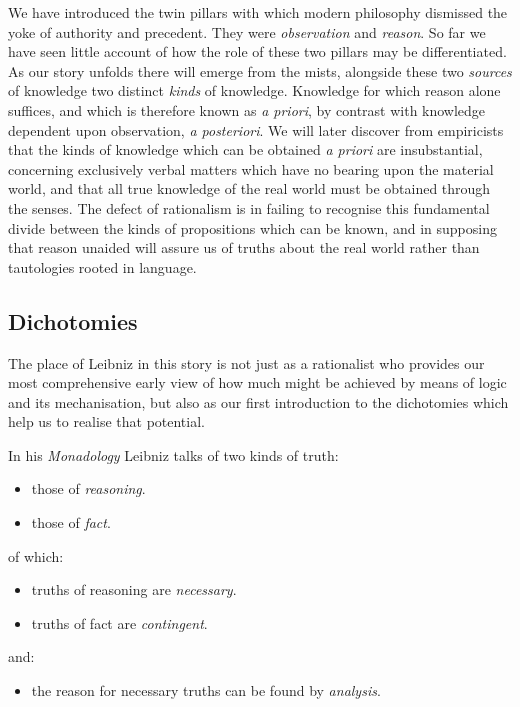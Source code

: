 We have introduced the twin pillars with which modern philosophy dismissed the yoke of authority and precedent.
They were {\it observation} and {\it reason}.
So far we have seen little account of how the role of these two pillars may be differentiated.
As our story unfolds there will emerge from the mists, alongside these two {\it sources} of knowledge two distinct {\it kinds} of knowledge.
Knowledge for which reason alone suffices, and which is therefore known as {\it a priori}, by contrast with knowledge dependent upon observation, {\it a posteriori}.
We will later discover from empiricists that the kinds of knowledge which can be obtained {\it a priori} are insubstantial, concerning exclusively verbal matters which have no bearing upon the material world, and that all true knowledge of the real world must be obtained through the senses.
The defect of rationalism is in failing to recognise this fundamental divide between the kinds of propositions which can be known, and in supposing that reason unaided will assure us of truths about the real world rather than tautologies rooted in language.

 
\subsection{Dichotomies}

The place of Leibniz in this story is not just as a rationalist who provides our most comprehensive early view of how much might be achieved by means of logic and its mechanisation, but also as our first introduction to the dichotomies which help us to realise that potential.

In his {\it Monadology} \cite{leibnizMON} Leibniz talks of two kinds of truth:
\begin{itemize}
\item those of {\it reasoning}.
\item those of {\it fact}.
\end{itemize}
of which:
\begin{itemize}
\item truths of reasoning are {\it necessary}.
\item truths of fact are {\it contingent}.
\end{itemize}
and:
\begin{itemize}
\item the reason for necessary truths can be found by {\it analysis}.
\end{itemize}

